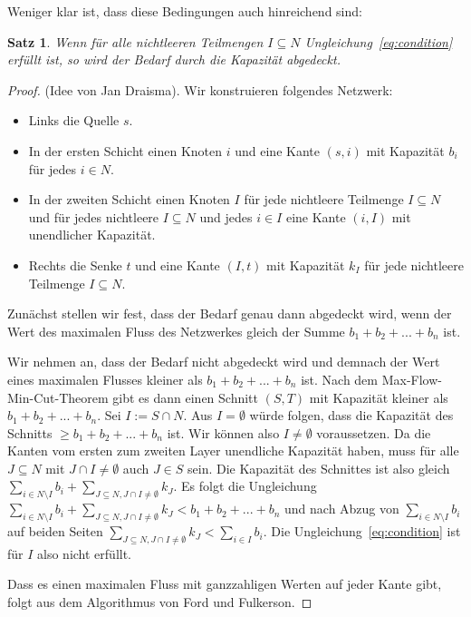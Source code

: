 \documentclass{article}
\newtheorem{theorem}{Satz}
\begin{document}
	
	Weniger klar ist, dass diese Bedingungen auch hinreichend sind:

	\begin{theorem}
		Wenn für alle nichtleeren Teilmengen $I\subseteq N$ Ungleichung~\ref{eq:condition} erfüllt ist, so wird der Bedarf durch die Kapazität abgedeckt.
	\end{theorem}
	
	\begin{proof} 
		(Idee von Jan Draisma).
		Wir konstruieren folgendes Netzwerk:
		\begin{itemize}
			\item Links die Quelle $s$.
			\item In der ersten Schicht einen Knoten $i$ und eine Kante $(s, i)$ mit Kapazität $b_i$ für jedes $i\in N$.
			\item In der zweiten Schicht einen Knoten $I$ für jede nichtleere Teilmenge $I\subseteq N$ und für jedes nichtleere $I\subseteq N$ und jedes $i\in I$ eine Kante $(i, I)$ mit unendlicher Kapazität.
			\item Rechts die Senke $t$ und eine Kante $(I, t)$ mit Kapazität $k_I$ für jede nichtleere Teilmenge $I\subseteq N$.
		\end{itemize}
		Zunächst stellen wir fest, dass der Bedarf genau dann abgedeckt wird, wenn der Wert des maximalen Fluss des Netzwerkes gleich der Summe $b_1+b_2+...+b_n$ ist. 
		
		 Wir nehmen an, dass der Bedarf nicht abgedeckt wird und demnach der Wert eines maximalen Flusses kleiner als $b_1+b_2+...+b_n$ ist. Nach dem Max-Flow-Min-Cut-Theorem gibt es dann einen Schnitt $(S, T)$ mit Kapazität kleiner als $b_1+b_2+...+b_n$. Sei $I:=S\cap N$. Aus $I=\emptyset$ würde folgen, dass die Kapazität des Schnitts $\geq b_1+b_2+...+b_n$ ist. Wir können also $I\neq \emptyset$ voraussetzen. Da die Kanten vom ersten zum zweiten Layer unendliche Kapazität haben, muss für alle $J\subseteq N$ mit $J\cap I\neq \emptyset$ auch $J\in S$ sein. Die Kapazität des Schnittes ist also gleich $\sum_{i\in N\setminus I}b_i+\sum_{J\subseteq N, J\cap I\neq \emptyset}k_J$. Es folgt die Ungleichung
		$\sum_{i\in N\setminus I}b_i+\sum_{J\subseteq N, J\cap I\neq \emptyset}k_J < b_1+b_2+...+b_n$ und nach Abzug von $\sum_{i\in N\setminus I}b_i$ auf beiden Seiten $\sum_{J\subseteq N, J\cap I\neq \emptyset}k_J < \sum_{i\in I}b_i$. Die Ungleichung~\ref{eq:condition} ist für $I$ also nicht erfüllt.
		
		Dass es einen maximalen Fluss mit ganzzahligen Werten auf jeder Kante gibt, folgt aus dem Algorithmus von Ford und Fulkerson.
	\end{proof}
\end{document}
